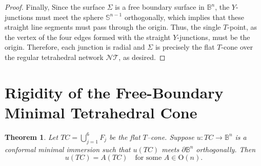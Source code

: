 \documentclass[11pt]{amsart}
\numberwithin{equation}{section}
\theoremstyle{theorem}
\newtheorem{theorem}{Theorem}[section]
\theoremstyle{definition}
\numberwithin{equation}{section}
\begin{document}
\begin{proof}
Finally, Since the surface $\Sigma$ is a free boundary surface in $\mathbb{B}^n$, the $Y$-junctions must meet the sphere $\mathbb{S}^{n-1}$ orthogonally, which implies that these straight line segments must pass through the origin. Thus, the single $T$-point, as the vertex of the four edges formed with the straight $Y$-junctions, must be the origin. Therefore, each junction is radial and \(\Sigma\) is precisely the flat $T$-cone over the regular tetrahedral network \(\mathcal{NT}\), as desired. 
\end{proof}


\section{Rigidity of the Free-Boundary Minimal Tetrahedral Cone}\label{sec:uniq. Tcone}

\begin{theorem}\label{thm:Tcone}
Let $TC = \bigcup_{j=1}^{6} F_j$ be the flat $T$--cone. Suppose 
$u : TC \to \mathbb{B}^n$ is a conformal minimal immersion such that 
$u(TC)$ meets $\partial \mathbb{B}^n$ orthogonally. Then \[
u(TC) = A(TC) \quad \text{for some } A \in \mathrm{O}(n).
\]
\end{theorem}
\end{document}
